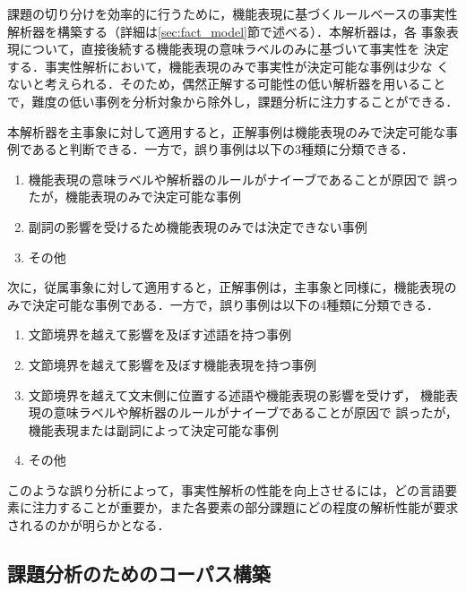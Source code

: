 \documentclass[japanese]{jnlp_1.4}
\begin{document}
課題の切り分けを効率的に行うために，機能表現に基づくルールベースの事実性
解析器を構築する（詳細は\ref{sec:fact_model}節で述べる）．本解析器は，各
事象表現について，直接後続する機能表現の意味ラベルのみに基づいて事実性を
決定する．事実性解析において，機能表現のみで事実性が決定可能な事例は少な
くないと考えられる．そのため，偶然正解する可能性の低い解析器を用いること
で，難度の低い事例を分析対象から除外し，課題分析に注力することができる．

本解析器を主事象に対して適用すると，正解事例は機能表現のみで決定可能な事
例であると判断できる．一方で，誤り事例は以下の3種類に分類できる．
\begin{enumerate}
 \item 機能表現の意味ラベルや解析器のルールがナイーブであることが原因で
       誤ったが，機能表現のみで決定可能な事例
 \item 副詞の影響を受けるため機能表現のみでは決定できない事例
 \item その他
\end{enumerate}
次に，従属事象に対して適用すると，正解事例は，主事象と同様に，機能表現の
みで決定可能な事例である．一方で，誤り事例は以下の4種類に分類できる．
\begin{enumerate}
 \item 文節境界を越えて影響を及ぼす述語を持つ事例
 \item 文節境界を越えて影響を及ぼす機能表現を持つ事例
 \item 文節境界を越えて文末側に位置する述語や機能表現の影響を受けず，
       機能表現の意味ラベルや解析器のルールがナイーブであることが原因で
       誤ったが，機能表現または副詞によって決定可能な事例
 \item その他
\end{enumerate}
このような誤り分析によって，事実性解析の性能を向上させるには，どの言語要
素に注力することが重要か，また各要素の部分課題にどの程度の解析性能が要求
されるのかが明らかとなる．


\subsection{課題分析のためのコーパス構築}
\end{document}
